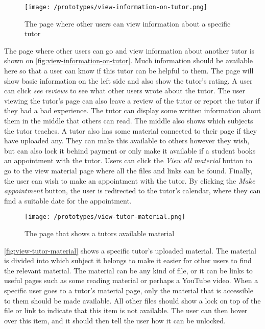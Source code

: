  \begin{figure}[H]
    \texttt{[image: /prototypes/view-information-on-tutor.png]}
     \caption{The page where other users can view information about a specific tutor}
     \label{fig:view-information-on-tutor}
 \end{figure}
 \noindent
The page where other users can go and view information about another tutor is shown on \autoref{fig:view-information-on-tutor}. 
Much information should be available here so that a user can know if this tutor can be helpful to them.
The page will show basic information on the left side and also show the tutor's rating. 
A user can click \textit{see reviews} to see what other users wrote about the tutor. 
The user viewing the tutor's page can also leave a review of the tutor or report the tutor if they had a bad experience. 
The tutor can display some written information about them in the middle that others can read. 
The middle also shows which subjects the tutor teaches. 
A tutor also has some material connected to their page if they have uploaded any. 
They can make this available to others however they wish, but can also lock it behind payment or only make it available if a student books an appointment with the tutor.
Users can click the \textit{View all material} button to go to the view material page where all the files and links can be found. 
Finally, the user can wish to make an appointment with the tutor. 
By clicking the \textit{Make appointment} button, the user is redirected to the tutor's calendar, where they can find a suitable date for the appointment. 


 \begin{figure}[H]
    \texttt{[image: /prototypes/view-tutor-material.png]}
     \caption{The page that shows a tutors available material}
     \label{fig:view-tutor-material}
 \end{figure}
 \noindent
\autoref{fig:view-tutor-material} shows a specific tutor's uploaded material. 
The material is divided into which subject it belongs to make it easier for other users to find the relevant material. 
The material can be any kind of file, or it can be links to useful pages such as some reading material or perhaps a YouTube video. 
When a specific user goes to a tutor's material page, only the material that is accessible to them should be made available. 
All other files should show a lock on top of the file or link to indicate that this item is not available. 
The user can then hover over this item, and it should then tell the user how it can be unlocked. 
